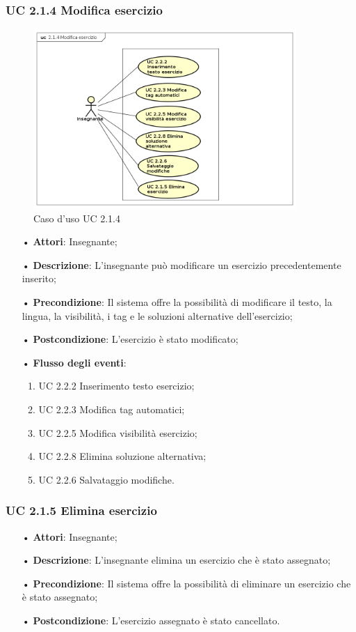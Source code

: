 \subsubsection{UC 2.1.4 Modifica esercizio}

\begin{figure}[H]
\centering
\includegraphics[width=10cm]{img/UC214.png} 
\caption{Caso d'uso UC 2.1.4}
\end{figure}

\begin{itemize}
	\item[•] \textbf{Attori}: Insegnante;
	\item[•] \textbf{Descrizione}: L’insegnante può modificare un esercizio precedentemente inserito;
	\item[•] \textbf{Precondizione}: Il sistema offre la possibilità di modificare il testo, la
				lingua, la visibilità, i {tag} e le soluzioni alternative 
				dell’esercizio;
	\item[•] \textbf{Postcondizione}: L’esercizio è stato modificato;
	\item[•] \textbf{Flusso degli eventi}:
		\begin{enumerate}
			\item UC 2.2.2 Inserimento testo esercizio;
			\item UC 2.2.3 Modifica {tag} automatici;
			\item UC 2.2.5 Modifica visibilità esercizio;
			\item UC 2.2.8 Elimina soluzione alternativa;
			\item UC 2.2.6 Salvataggio modifiche.
		\end{enumerate}
		    
\end{itemize}   	
\subsubsection{UC 2.1.5 Elimina esercizio}
\begin{itemize}
	\item[•] \textbf{Attori}: Insegnante;
	\item[•] \textbf{Descrizione}: L’insegnante elimina un esercizio che è stato assegnato;
	\item[•] \textbf{Precondizione}: Il sistema offre la possibilità di eliminare un esercizio che è stato assegnato;
	\item[•] \textbf{Postcondizione}: L’esercizio assegnato è stato cancellato.
\end{itemize}


